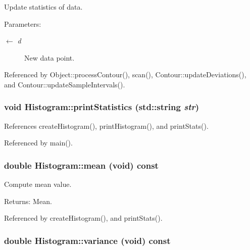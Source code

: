 Update statistics of data. \begin{Desc}
\item[Parameters:]
\begin{description}
\item[\mbox{$\leftarrow$} {\em d}]New data point. \end{description}
\end{Desc}


Referenced by Object::processContour(), scan(), Contour::updateDeviations(), and Contour::updateSampleIntervals().\hypertarget{classHistogram_7bb79b6a488124f1e4128390541ef126}{
\subsubsection[printStatistics]{\setlength{\rightskip}{0pt plus 5cm}void Histogram::printStatistics (std::string {\em str})}}
\label{classHistogram_7bb79b6a488124f1e4128390541ef126}




References createHistogram(), printHistogram(), and printStats().

Referenced by main().\hypertarget{classHistogram_2ac97cb3e642dee7fa5a9d7bb2d1e451}{
\subsubsection[mean]{\setlength{\rightskip}{0pt plus 5cm}double Histogram::mean (void) const}}
\label{classHistogram_2ac97cb3e642dee7fa5a9d7bb2d1e451}


Compute mean value. \begin{Desc}
\item[Returns:]Mean. \end{Desc}


Referenced by createHistogram(), and printStats().\hypertarget{classHistogram_7e1d2c7680730e9536f5496e8c0bacaa}{
\subsubsection[variance]{\setlength{\rightskip}{0pt plus 5cm}double Histogram::variance (void) const}}
\label{classHistogram_7e1d2c7680730e9536f5496e8c0bacaa}


